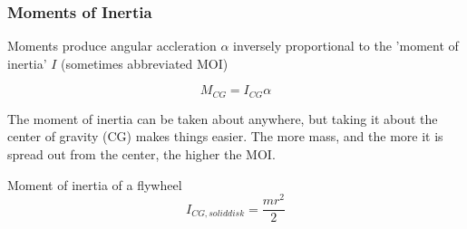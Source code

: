 \documentclass{article}%
\begin{document}
\begin{frame}
\frametitle{Moments of Inertia}

Moments produce angular accleration $\alpha$ inversely proportional to the 'moment of inertia' $I$ (sometimes abbreviated MOI)

\begin{equation}
	M_{CG} = I_{CG} \alpha
\end{equation}

The moment of inertia can be taken about anywhere, but taking it about the center of gravity (CG) makes things easier. The more mass, and the more it is spread out from the center, the higher the MOI.

\begin{example}
Moment of inertia of a flywheel
\begin{equation}
	I_{CG, solid disk} = \frac{m r^2}{2}
\end{equation}
\end{example}

\end{frame}
\end{document}
